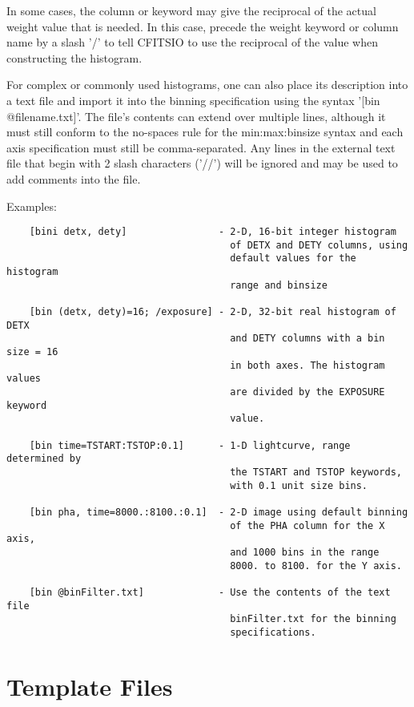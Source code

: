 \documentclass[11pt]{book}
\begin{document}
In some cases, the column or keyword may give the reciprocal of the
actual weight value that is needed.  In this case, precede the weight
keyword or column name by a slash '/' to tell CFITSIO to use the
reciprocal of the value when constructing the histogram.

For  complex or commonly  used  histograms, one  can also  place its
description  into  a  text  file and  import   it  into  the binning
specification  using the  syntax '[bin  @filename.txt]'.  The file's
contents  can extend over   multiple lines, although  it must still
conform to the  no-spaces rule  for the min:max:binsize syntax and each
axis specification must still be comma-separated.  Any lines in the
external text file that begin with 2 slash characters ('//') will be
ignored and may be used to add comments into the file.

 Examples:


\begin{verbatim}
    [bini detx, dety]                - 2-D, 16-bit integer histogram
                                       of DETX and DETY columns, using
                                       default values for the histogram
                                       range and binsize

    [bin (detx, dety)=16; /exposure] - 2-D, 32-bit real histogram of DETX
                                       and DETY columns with a bin size = 16
                                       in both axes. The histogram values
                                       are divided by the EXPOSURE keyword
                                       value.

    [bin time=TSTART:TSTOP:0.1]      - 1-D lightcurve, range determined by
                                       the TSTART and TSTOP keywords,
                                       with 0.1 unit size bins.

    [bin pha, time=8000.:8100.:0.1]  - 2-D image using default binning
                                       of the PHA column for the X axis,
                                       and 1000 bins in the range
                                       8000. to 8100. for the Y axis.

    [bin @binFilter.txt]             - Use the contents of the text file
                                       binFilter.txt for the binning
                                       specifications.

\end{verbatim}


\chapter{Template Files }
\end{document}
